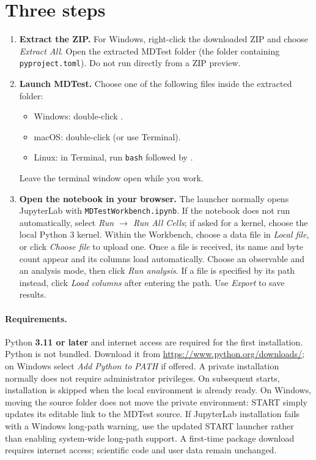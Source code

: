 \documentclass[11pt,oneside]{report}
\begin{document}
\section*{Three steps}
\begin{enumerate}[leftmargin=*]
\item \textbf{Extract the ZIP.} For Windows, right-click the downloaded ZIP and choose \emph{Extract All}. Open the extracted MDTest folder (the folder containing \texttt{pyproject.toml}). Do not run directly from a ZIP preview.
\item \textbf{Launch MDTest.} Choose one of the following files inside the extracted folder:
\begin{itemize}[leftmargin=*,nosep]
\item Windows: double-click .
\item macOS: double-click  (or use Terminal).
\item Linux: in Terminal, run \texttt{bash} followed by .
\end{itemize}
Leave the terminal window open while you work.
\item \textbf{Open the notebook in your browser.} The launcher normally opens JupyterLab with \texttt{MDTestWorkbench.ipynb}. If the notebook does not run automatically, select \emph{Run $\rightarrow$ Run All Cells}; if asked for a kernel, choose the local Python 3 kernel. Within the Workbench, choose a data file in \emph{Local file}, or click \emph{Choose file} to upload one. Once a file is received, its name and byte count appear and its columns load automatically. Choose an observable and an analysis mode, then click \emph{Run analysis}. If a file is specified by its path instead, click \emph{Load columns} after entering the path. Use \emph{Export} to save results.
\end{enumerate}

\paragraph{Requirements.} Python \textbf{3.11 or later} and internet access are required for the first installation. Python is not bundled. Download it from \url{https://www.python.org/downloads/}; on Windows select \emph{Add Python to PATH} if offered. A private installation normally does not require administrator privileges. On subsequent starts, installation is skipped when the local environment is already ready. On Windows, moving the source folder does not move the private environment: START simply updates its editable link to the MDTest source. If JupyterLab installation fails with a Windows long-path warning, use the updated START launcher rather than enabling system-wide long-path support. A first-time package download requires internet access; scientific code and user data remain unchanged.
\end{document}
